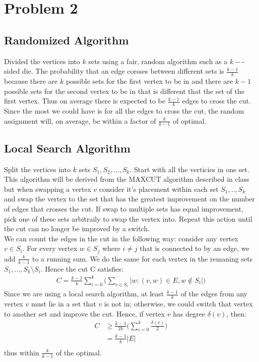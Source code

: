 \documentclass[11pt]{article}
\begin{document}
\section*{Problem 2}
\subsection*{Randomized Algorithm}
Divided the vertices into $k$ sets using a fair, random algorithm such as a $k-$-sided die. The probability that an edge corsses between different sets is $\frac{k-1}{k}$ because there are $k$ possible sets for the first vertex to be in and there are $k-1$ possible sets for the second vertex to be in that is different that the set of the first vertex. Thus on average there is expected to be $\frac{k-1}{k}$ edges to cross the cut. Since the most we could have is for all the edges to cross the cut, the random assignment will, on average, be within a factor of $\frac{k}{k-1}$ of optimal.

\subsection*{Local Search Algorithm}
Split the vertices into $k$ sets $S_1,S_2, ..., S_k$. Start with all the verticies in one set. This algorithm will be derived from the MAXCUT algorithm described in class but when swapping a vertex $v$ consider it's placement within each set $S_1, .., S_k$ and swap the vertex to the set that has the greatest improvement on the number of edges that crosses the cut. If swap to multiple sets has equal improvement, pick one of these sets arbitraily to swap the vertex into. Repeat this action until the cut can no longer be improved by a switch.\\

We can count the edges in the cut in the following way: consider any vertex $v \in S_i$. For every vertex $w \in S_j$ where $i \not= j$ that is connected to by an edge, we add $\frac{k}{k-1}$ to a running sum. We do the same for each vertex in the remaning sets $S_1, ... ,S_k \setminus S_i$. Hence the cut C satisfies:
\begin{align*}
C = \frac{k-1}{k} \sum_{i=0}^{k} \bigg( \sum_{v \in S_i}^{} |w:(v,w) \in E, w \not \in S_i| \bigg)
\end{align*}
Since we are using a local search algorithm, at least $\frac{k-1}{k}$ of the edges from any vertex $v$ must lie in a set that $v$ is not in; otherwise, we could switch that vertex to another set and improve the cut. Hence, if vertex $v$ has degree $\delta (v)$, then:
\begin{align*}
C &\geq \frac{k-1}{2k} \bigg( \sum_{i=0}^{k} \frac{\delta (v)}{2} \bigg)\\
&= \frac{k-1}{k} |E|\\
\end{align*}
thus within $\frac{k}{k-1}$ of the optimal.
\end{document}
